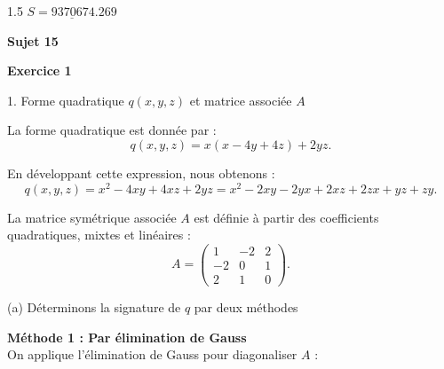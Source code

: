 \documentclass[12pt]{article}
\begin{document}
\begin{spacing}{1.5}
\hspace{0.058cm}$\underline{S=9370674.269}$


\medskip\textbf{Sujet 15}

\medskip\textbf{Exercice 1}

1. Forme quadratique $q(x, y, z)$ et matrice associée $A$

La forme quadratique est donnée par :
\[
q(x, y, z) = x(x - 4y + 4z) + 2yz.
\]

\noindent En développant cette expression, nous obtenons :
\[
q(x, y, z) = x^2 - 4xy + 4xz + 2yz=x^2-2xy-2yx+2xz+2zx+yz+zy.
\]

\noindent La matrice symétrique associée $A$ est définie à partir des coefficients quadratiques, mixtes et linéaires :
\[
A = 
\begin{pmatrix}
1 & -2 & 2 \\
-2 & 0 & 1 \\
2 & 1 & 0
\end{pmatrix}.
\]

\noindent (a) Déterminons la signature de $q$ par deux méthodes

\textbf{Méthode 1 : Par élimination de Gauss} \\
On applique l'élimination de Gauss pour diagonaliser $A$ :


\end{spacing}
\end{document}
